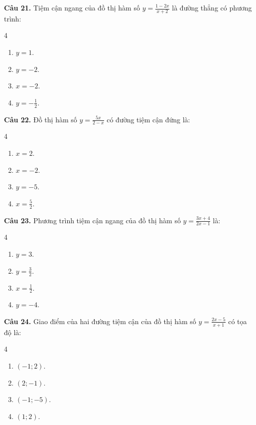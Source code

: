 \documentclass[12pt]{article}
\begin{document}
	\vspace{0.4cm}
	\noindent \textbf{Câu 21.} Tiệm cận ngang của đồ thị hàm số $y = \frac{1 - 2x}{x + 2}$ là đường thẳng có phương trình:
	\begin{multicols}{4}
		\begin{enumerate}[label=\textbf{\Alph*.}]
			\item $y = 1$.
			\item $y = -2$.
			\item $x = -2$.
			\item $y = -\frac{1}{2}$.
		\end{enumerate}
	\end{multicols}
	
	\vspace{0.4cm}
	\noindent \textbf{Câu 22.} Đồ thị hàm số $y = \frac{5x}{2 - x}$ có đường tiệm cận đứng là:
	\begin{multicols}{4}
		\begin{enumerate}[label=\textbf{\Alph*.}]
			\item $x = 2$.
			\item $x = -2$.
			\item $y = -5$.
			\item $x = \frac{5}{2}$.
		\end{enumerate}
	\end{multicols}
	
	\vspace{0.4cm}
	\noindent \textbf{Câu 23.} Phương trình tiệm cận ngang của đồ thị hàm số $y = \frac{3x + 4}{2x - 1}$ là:
	\begin{multicols}{4}
		\begin{enumerate}[label=\textbf{\Alph*.}]
			\item $y = 3$.
			\item $y = \frac{3}{2}$.
			\item $x = \frac{1}{2}$.
			\item $y = -4$.
		\end{enumerate}
	\end{multicols}
	
	\vspace{0.4cm}
	\noindent \textbf{Câu 24.} Giao điểm của hai đường tiệm cận của đồ thị hàm số $y = \frac{2x - 5}{x + 1}$ có tọa độ là:
	\begin{multicols}{4}
		\begin{enumerate}[label=\textbf{\Alph*.}]
			\item $(-1; 2)$.
			\item $(2; -1)$.
			\item $(-1; -5)$.
			\item $(1; 2)$.
		\end{enumerate}
	\end{multicols}
	
\end{document}

